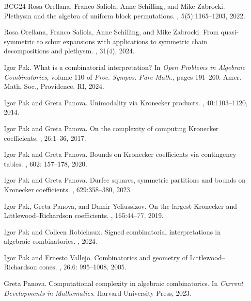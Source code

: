 \documentclass[11pt]{amsart}
\theoremstyle{plain}
\theoremstyle{definition}
\numberwithin{equation}{section}
\begin{document}
\begin{thebibliography}{BCG{\etalchar{+}}24}
Rosa Orellana, Franco Saliola, Anne Schilling, and Mike Zabrocki.
\newblock Plethysm and the algebra of uniform block permutations.
, 5(5):1165--1203, 2022.

Rosa Orellana, Franco Saliola, Anne Schilling, and Mike Zabrocki.
\newblock From quasi-symmetric to schur expansions with applications to
  symmetric chain decompositions and plethysm.
, 31(4), 2024.

Igor Pak.
\newblock What is a combinatorial interpretation?
\newblock In {\em Open Problems in Algebraic Combinatorics}, volume 110 of {\em
  Proc. Sympos. Pure Math.}, pages 191--260. Amer. Math. Soc., Providence, RI,
  2024.



Igor Pak and Greta Panova.
\newblock Unimodality via {K}ronecker products.
, 40:1103--1120, 2014.

Igor Pak and Greta Panova.
\newblock On the complexity of computing {K}ronecker coefficients.
, 26:1--36, 2017.

 Igor Pak and Greta Panova. 
 \newblock Bounds on Kronecker coefficients via contingency tables.
 , 602: 157--178, 2020.


Igor Pak and Greta Panova.
\newblock Durfee squares, symmetric partitions and bounds on {K}ronecker
  coefficients.
, 629:358--380, 2023.

Igor Pak, Greta Panova, and Damir Yeliussizov.
\newblock On the largest {K}ronecker and {L}ittlewood--{R}ichardson
  coefficients.
, 165:44--77, 2019.

Igor Pak and Colleen Robichaux.
\newblock Signed combinatorial interpretations in algebraic combinatorics.
, 2024.

 Igor Pak and Ernesto Vallejo. 
 \newblock Combinatorics and geometry of Littlewood–Richardson cones.
 , 26.6: 995--1008, 2005.

Greta Panova.
\newblock Computational complexity in algebraic combinatorics.
\newblock In {\em Current Developments in Mathematics}. Harvard University
  Press, 2023.


\end{thebibliography}
\end{document}
